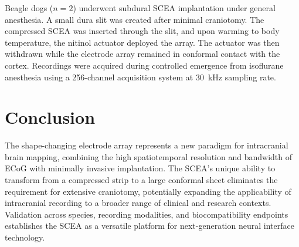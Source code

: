 \documentclass[11pt]{article}
\begin{document}
Beagle dogs ($n = 2$) underwent subdural SCEA implantation under general anesthesia. A small dura slit was created after minimal craniotomy. The compressed SCEA was inserted through the slit, and upon warming to body temperature, the nitinol actuator deployed the array. The actuator was then withdrawn while the electrode array remained in conformal contact with the cortex. Recordings were acquired during controlled emergence from isoflurane anesthesia using a 256-channel acquisition system at 30~kHz sampling rate.

\section{Conclusion}

The shape-changing electrode array represents a new paradigm for intracranial brain mapping, combining the high spatiotemporal resolution and bandwidth of ECoG with minimally invasive implantation. The SCEA's unique ability to transform from a compressed strip to a large conformal sheet eliminates the requirement for extensive craniotomy, potentially expanding the applicability of intracranial recording to a broader range of clinical and research contexts. Validation across species, recording modalities, and biocompatibility endpoints establishes the SCEA as a versatile platform for next-generation neural interface technology.



\end{document}
